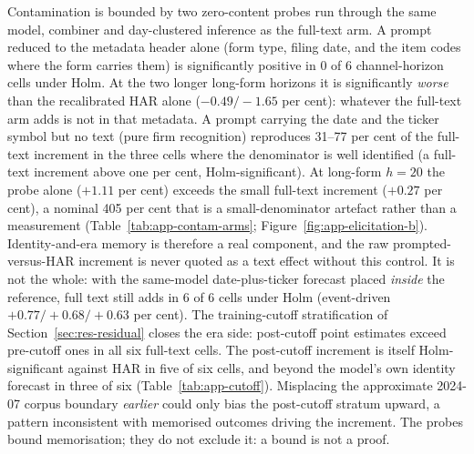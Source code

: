 Contamination is bounded by two zero-content probes run through the same model, combiner and day-clustered inference as the full-text arm. A prompt reduced to the metadata header alone (form type, filing date, and the item codes where the form carries them) is significantly positive in 0 of 6 channel-horizon cells under Holm. At the two longer long-form horizons it is significantly \emph{worse} than the recalibrated HAR alone ($-0.49/-1.65$ per cent): whatever the full-text arm adds is not in that metadata. %
A prompt carrying the date and the ticker symbol but no text (pure firm recognition) reproduces 31--77 per cent of the full-text increment in the three cells where the denominator is well identified (a full-text increment above one per cent, Holm-significant). At long-form $h{=}20$ the probe alone ($+1.11$ per cent) exceeds the small full-text increment ($+0.27$ per cent), a nominal 405 per cent that is a small-denominator artefact rather than a measurement (Table~\ref{tab:app-contam-arms}; Figure~\ref{fig:app-elicitation-b}). %
Identity-and-era memory is therefore a real component, and the raw prompted-versus-HAR increment is never quoted as a text effect without this control. It is not the whole: with the same-model date-plus-ticker forecast placed \emph{inside} the reference, full text still adds in 6 of 6 cells under Holm (event-driven $+0.77/+0.68/+0.63$ per cent). %
The training-cutoff stratification of Section~\ref{sec:res-residual} closes the era side: post-cutoff point estimates exceed pre-cutoff ones in all six full-text cells. The post-cutoff increment is itself Holm-significant against HAR in five of six cells, and beyond the model's own identity forecast in three of six (Table~\ref{tab:app-cutoff}). Misplacing the approximate 2024-07 corpus boundary \emph{earlier} could only bias the post-cutoff stratum upward, a pattern inconsistent with memorised outcomes driving the increment. %
The probes bound memorisation; they do not exclude it: a bound is not a proof.

